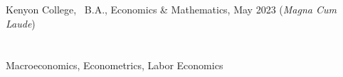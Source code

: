 \documentclass[margin, 11pt]{res} %
\begin{document}
\begin{resume}






\section{}

Kenyon College,  \  B.A., Economics \& Mathematics, May 2023 (\emph{Magna Cum Laude}) 




\section{}
Macroeconomics, Econometrics, Labor Economics \\


 



\end{resume}
\end{document}
